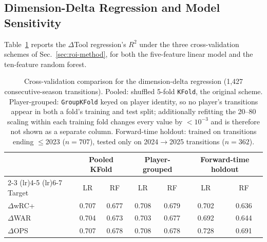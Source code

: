\documentclass[10pt,twocolumn,letterpaper]{article}
\begin{document}
\subsection{Dimension-Delta Regression and Model Sensitivity}
\label{sec:roi-results}
Table~\ref{tab:cv} reports the $\Delta$Tool regression's $R^2$ under the three cross-validation schemes of Sec.~\ref{sec:roi-method}, for both the five-feature linear model and the ten-feature random forest.

\begin{table}[t]
\centering
\caption{Cross-validation comparison for the dimension-delta regression (1{,}427 consecutive-season transitions). Pooled: shuffled 5-fold \texttt{KFold}, the original scheme. Player-grouped: \texttt{GroupKFold} keyed on player identity, so no player's transitions appear in both a fold's training and test split; additionally refitting the 20--80 scaling within each training fold changes every value by $<10^{-3}$ and is therefore not shown as a separate column. Forward-time holdout: trained on transitions ending $\leq$2023 ($n=707$), tested only on 2024$\to$2025 transitions ($n=362$).}
\label{tab:cv}
\small
\begin{tabular}{lcccccc}
\toprule
 & \multicolumn{2}{c}{Pooled KFold} & \multicolumn{2}{c}{Player-grouped} & \multicolumn{2}{c}{Forward-time holdout} \\
\cmidrule(lr){2-3} \cmidrule(lr){4-5} \cmidrule(lr){6-7}
Target & LR & RF & LR & RF & LR & RF \\
\midrule
$\Delta$wRC+ & 0.707 & 0.677 & 0.708 & 0.679 & 0.702 & 0.636 \\
$\Delta$WAR  & 0.704 & 0.673 & 0.703 & 0.677 & 0.692 & 0.644 \\
$\Delta$OPS  & 0.707 & 0.678 & 0.708 & 0.678 & 0.728 & 0.691 \\
\bottomrule
\end{tabular}
\end{table}
\end{document}
